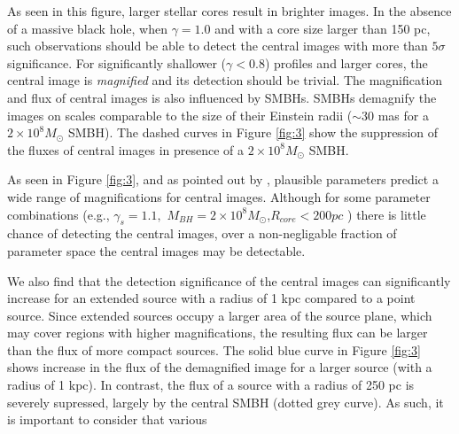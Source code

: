 \documentclass[chicago]{emulateapj}
\newcommand{\red}{\textcolor{red}}
\begin{document}
As seen in this figure, larger stellar cores result in brighter images. %
In the absence of a massive black hole, when $\gamma=1.0$ and with a core size larger than 150 pc, such observations should be able to detect the central images with more than $5\sigma$ significance. For significantly shallower ($\gamma<0.8$) profiles and larger cores, the central image is \emph{magnified} and its detection should be trivial.  The magnification and flux of central images is also influenced by SMBHs.
SMBHs demagnify the images on scales comparable to the size of their Einstein radii ($\sim30$ mas for a $2\times10^8M_{\odot}$ SMBH).
The dashed curves in Figure \ref{fig:3} show the suppression of the fluxes of central images in presence of a $2\times10^8M_{\odot}$ SMBH.

As seen in Figure \ref{fig:3}, and as pointed out by \citet{Keeton:03}, plausible parameters predict  a wide range of magnifications for   central images. Although for some parameter combinations (e.g., $\gamma_{s}=1.1,$ $M_{BH} = 2\times10^8 M_{\odot}$,$R_{core}<200 pc$ ) there is little chance of detecting the central images, over a non-negligable fraction of parameter space the central images may be detectable. 

We also find that the detection significance of the central images can significantly increase for an extended source with a radius of 1 kpc compared to a point source. Since extended sources occupy a larger area of the source plane, which may cover regions with higher magnifications, the resulting flux can be larger than the flux of more compact sources. The solid blue curve in Figure \ref{fig:3} shows increase in the flux of the demagnified image for a larger source (with a radius of 1 kpc). In contrast, the flux of a source with a radius of 250 pc is severely supressed, largely by the central SMBH (dotted grey curve). As such, it is important to consider that various 
\end{document}
